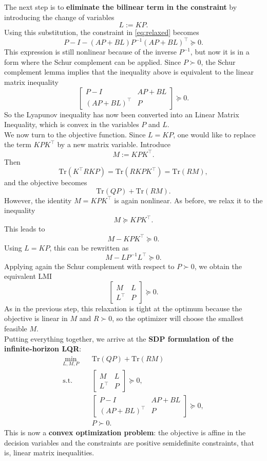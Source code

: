 The next step is to \textbf{eliminate the bilinear term in the constraint} by introducing the change of
variables
\[
L := KP.
\]
Using this substitution, the constraint in \eqref{eq:relaxed} becomes
\[
P - I - (AP+BL)P^{-1}(AP+BL)^\top \succeq 0.
\]
This expression is still nonlinear because of the inverse $P^{-1}$, but now it is in a form where
the Schur complement can be applied. Since $P\succ 0$, the Schur complement lemma implies
that the inequality above is equivalent to the linear matrix inequality
\begin{equation}
\begin{bmatrix}
P-I & AP+BL\\
(AP+BL)^\top & P
\end{bmatrix}
\succeq 0.
\end{equation}
So the Lyapunov inequality has now been converted into an Linear Matrix Inequality, which is convex in the
variables $P$ and $L$.\\

We now turn to the objective function. Since $L=KP$, one would like to replace the term
$KPK^\top$ by a new matrix variable. Introduce
\[
M := KPK^\top.
\]
Then
\[
\text{Tr}(K^\top RKP)=\text{Tr}(RKPK^\top)=\text{Tr}(RM),
\]
and the objective becomes
\[
\text{Tr}(QP)+\text{Tr}(RM).
\]
However, the identity $M=KPK^\top$ is again nonlinear. As before, we relax it to the inequality
\[
M \succeq KPK^\top.
\]
This leads to
\[
M - KPK^\top \succeq 0.
\]
Using $L=KP$, this can be rewritten as
\[
M - LP^{-1}L^\top \succeq 0.
\]
Applying again the Schur complement with respect to $P\succ 0$, we obtain the equivalent LMI
\begin{equation}
\begin{bmatrix}
M & L\\
L^\top & P
\end{bmatrix}
\succeq 0.
\label{eq:Schur}
\end{equation}
As in the previous step, this relaxation is tight at the optimum because the objective is linear in
$M$ and $R\succ 0$, so the optimizer will choose the smallest feasible $M$.\\
Putting everything together, we arrive at the \textbf{SDP formulation of the infinite-horizon LQR}:
\begin{equation}
\begin{aligned}
\min_{L,M,P}\quad
& \text{Tr}(QP)+\text{Tr}(RM)\\
\text{s.t.}\quad
& \begin{bmatrix}
M & L\\
L^\top & P
\end{bmatrix}\succeq 0,\\[1em]
& \begin{bmatrix}
P-I & AP+BL\\
(AP+BL)^\top & P
\end{bmatrix}\succeq 0,\\
& P \succ 0.
\end{aligned}
\end{equation}
This is now a \textbf{convex optimization problem}: the objective is affine in the decision variables
and the constraints are positive semidefinite constraints, that is, linear matrix inequalities.\\

